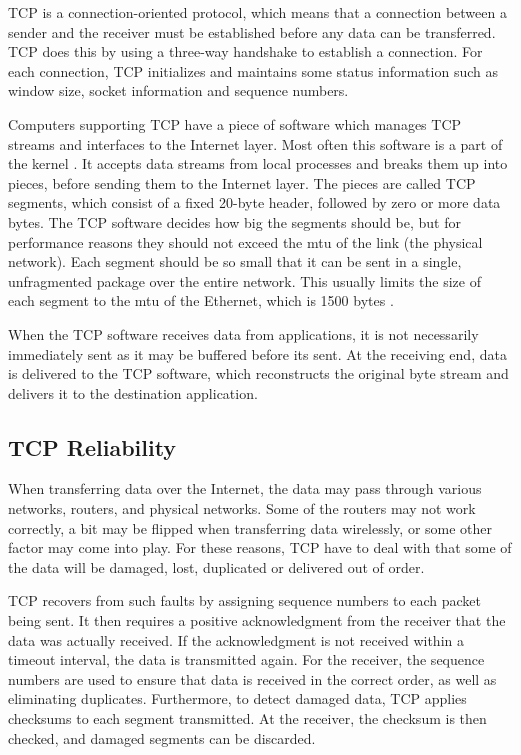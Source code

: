  TCP is a connection-oriented protocol, which means that a connection between a
 sender and the receiver must be established before any data can be transferred.
 TCP does this by using a three-way handshake to establish a connection. For
 each connection, TCP initializes and maintains some status information such as
 window size, socket information and sequence numbers.

Computers supporting TCP have a piece of software which manages TCP streams and
interfaces to the Internet layer. Most often this software is a part of the
kernel \cite{computer-networks}. It accepts data streams from local processes
and breaks them up into pieces, before sending them to the Internet layer. The
pieces are called TCP segments, which consist of a fixed 20-byte header,
followed by zero or more data bytes. The TCP software decides how big the
segments should be, but for performance reasons they should not exceed the
\gls{mtu} of the link (the physical network). Each segment should be so small
that it can be sent in a single, unfragmented package over the entire network.
This usually limits the size of each segment to the \gls{mtu} of the Ethernet,
which is 1500 bytes \cite{rfc-894}.

When the TCP software receives data from applications, it is not necessarily
immediately sent as it may be buffered before its sent. At the receiving end,
data is delivered to the TCP software, which reconstructs the original byte
stream and delivers it to the destination application.


\subsection{TCP Reliability}

When transferring data over the Internet, the data may pass through various
networks, routers, and physical networks. Some of the routers may not work
correctly, a bit may be flipped when transferring data wirelessly, or some other
factor may come into play. For these reasons, TCP have to deal with that some of
the data will be damaged, lost, duplicated or delivered out of order.

TCP recovers from such faults by assigning sequence numbers to each packet being
sent. It then requires a positive acknowledgment from the receiver that the data
was actually received. If the acknowledgment is not received within a timeout
interval, the data is transmitted again. For the receiver, the sequence numbers
are used to ensure that data is received in the correct order, as well as
eliminating duplicates. Furthermore, to detect damaged data, TCP applies
checksums to each segment transmitted. At the receiver, the checksum is then
checked, and damaged segments can be discarded.

